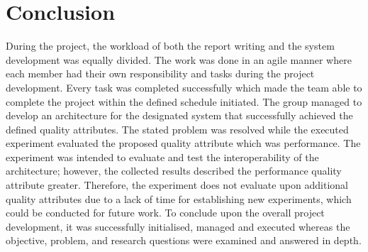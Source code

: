 \section{Conclusion}
During the project, the workload of both the report writing and the system development was equally divided. The work was done in an agile manner where each member had their own responsibility and tasks during the project development. Every task was completed successfully which made the team able to complete the project within the defined schedule initiated. The group managed to develop an architecture for the designated system that successfully achieved the defined quality attributes. The stated problem was resolved while the executed experiment evaluated the proposed quality attribute which was performance. The experiment was intended to evaluate and test the interoperability of the architecture; however, the collected results described the performance quality attribute greater. Therefore, the experiment does not evaluate upon additional quality attributes due to a lack of time for establishing new experiments, which could be conducted for future work. To conclude upon the overall project development, it was successfully initialised, managed and executed whereas the objective, problem, and research questions were examined and answered in depth.